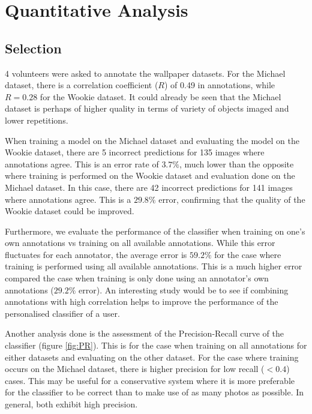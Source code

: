 %
\newpage
\chapter{Quantitative Analysis\label{sec:quantitative}}

\section{Selection}

4 volunteers were asked to annotate the wallpaper datasets.
For the Michael dataset, there is a correlation coefficient ($R$) of 0.49 in
annotations, while $R=0.28$ for the Wookie dataset.
It could already be seen that the Michael dataset is perhaps of higher quality
in terms of variety of objects imaged and lower repetitions.

When training a model on the Michael dataset and evaluating the model on the
Wookie dataset, there are 5 incorrect predictions for 135 images where
annotations agree.
This is an error rate of $3.7\%$, much lower than the opposite where training is
performed on the Wookie dataset and evaluation done on the Michael dataset.
In this case, there are 42 incorrect predictions for 141 images where
annotations agree.
This is a $29.8\%$ error, confirming that the quality of the Wookie dataset
could be improved.

Furthermore, we evaluate the performance of the classifier when training on
one’s own annotations vs training on all available annotations.
While this error fluctuates for each annotator, the average error is $59.2\%$
for the case where training is performed using all available annotations.
This is a much higher error compared the case when training is only done using
an annotator’s own annotations ($29.2\%$ error).
An interesting study would be to see if combining annotations with high
correlation helps to improve the performance of the personalised classifier
of a user.

Another analysis done is the assessment of the Precision-Recall curve of the
classifier (figure \ref{fig:PR}).
This is for the case when training on all annotations for either datasets and
evaluating on the other dataset.
For the case where training occurs on the Michael dataset, there is higher
precision for low recall ($<0.4$) cases.
This may be useful for a conservative system where it is more preferable for
the classifier to be correct than to make use of as many photos as possible.
In general, both exhibit high precision.

